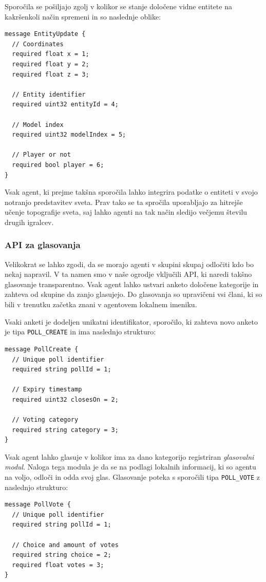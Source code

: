 \documentclass[a4paper,10pt]{article}
\begin{document}
Sporočila se pošiljajo zgolj v kolikor se stanje določene vidne entitete na kakršenkoli način spremeni in so naslednje oblike:
\begin{verbatim}
message EntityUpdate {
  // Coordinates
  required float x = 1;
  required float y = 2;
  required float z = 3;
  
  // Entity identifier
  required uint32 entityId = 4;
  
  // Model index
  required uint32 modelIndex = 5;
  
  // Player or not
  required bool player = 6;
}
\end{verbatim}

\noindent
Vsak agent, ki prejme takšna sporočila lahko integrira podatke o entiteti v svojo notranjo predstavitev sveta. Prav tako se ta spročila uporabljajo za hitrejše učenje topografije sveta, saj lahko agenti na tak način sledijo večjemu številu drugih igralcev.

\subsubsection{API za glasovanja}

Velikokrat se lahko zgodi, da se morajo agenti v skupini skupaj odločiti kdo bo nekaj napravil. V ta namen smo v naše ogrodje vključili API, ki naredi takšno glasovanje transparentno. Vsak agent lahko ustvari anketo določene kategorije in zahteva od skupine da zanjo glasujejo. Do glasovanja so upravičeni vsi člani, ki so bili v trenutku začetka znani v agentovem lokalnem imeniku.

Vsaki anketi je dodeljen unikatni identifikator, sporočilo, ki zahteva novo anketo je tipa \texttt{POLL\_CREATE} in ima naslednjo strukturo:
\begin{verbatim}
message PollCreate {
  // Unique poll identifier
  required string pollId = 1;
  
  // Expiry timestamp
  required uint32 closesOn = 2;
  
  // Voting category
  required string category = 3;
}
\end{verbatim}

Vsak agent lahko glasuje v kolikor ima za dano kategorijo registriran \textit{glasovalni modul}. Naloga tega modula je da se na podlagi lokalnih informacij, ki so agentu na voljo, odloči in odda svoj glas. Glasovanje poteka s sporočili tipa \texttt{POLL\_VOTE} z naslednjo strukturo:
\begin{verbatim}
message PollVote {
  // Unique poll identifier
  required string pollId = 1;
  
  // Choice and amount of votes
  required string choice = 2;
  required float votes = 3;
}
\end{verbatim}
\end{document}
